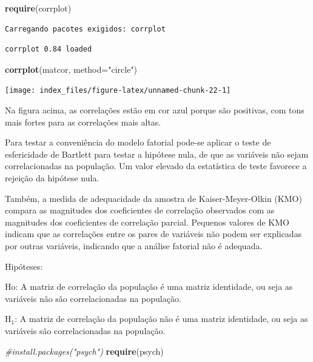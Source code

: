 \documentclass[12pt,brazil,oneside]{book}
\newenvironment{Shaded}{\begin{snugshade}}{\end{snugshade}}
\newcommand{\CommentTok}[1]{\textcolor[rgb]{0.56,0.35,0.01}{\textit{#1}}}
\newcommand{\DataTypeTok}[1]{\textcolor[rgb]{0.13,0.29,0.53}{#1}}
\newcommand{\KeywordTok}[1]{\textcolor[rgb]{0.13,0.29,0.53}{\textbf{#1}}}
\newcommand{\NormalTok}[1]{#1}
\newcommand{\StringTok}[1]{\textcolor[rgb]{0.31,0.60,0.02}{#1}}
\begin{document}
\begin{Shaded}
\begin{Highlighting}[]
\KeywordTok{require}\NormalTok{(corrplot)}
\end{Highlighting}
\end{Shaded}

\begin{verbatim}
Carregando pacotes exigidos: corrplot
\end{verbatim}

\begin{verbatim}
corrplot 0.84 loaded
\end{verbatim}

\begin{Shaded}
\begin{Highlighting}[]
\KeywordTok{corrplot}\NormalTok{(matcor, }\DataTypeTok{method=}\StringTok{"circle"}\NormalTok{)}
\end{Highlighting}
\end{Shaded}

\begin{center}\texttt{[image: index\_files/figure-latex/unnamed-chunk-22-1]} \end{center}

Na figura acima, as correlações estão em cor azul porque são positivas, com tons mais fortes para as correlações mais altas.

Para testar a conveniência do modelo fatorial pode-se aplicar o teste de esfericidade de Bartlett para testar a hipótese nula, de que as variáveis não sejam correlacionadas na população.
Um valor elevado da estatística de teste favorece a rejeição da hipótese nula.

Também, a medida de adequacidade da amostra de Kaiser-Meyer-Olkin (KMO) compara as magnitudes dos coeficientes de correlação observados com as magnitudes dos coeficientes de
correlação parcial. Pequenos valores de KMO indicam que as correlações entre os pares de variáveis não podem ser explicadas por outras variáveis, indicando que a análise fatorial não é adequada.

Hipóteses:

Ho: A matriz de correlação da população é uma matriz identidade, ou seja as variáveis não são correlacionadas na população.

H\(_1\): A matriz de correlação da população não é uma matriz identidade, ou seja as variáveis são correlacionadas na população.

\begin{Shaded}
\begin{Highlighting}[]
\CommentTok{#install.packages("psych")}
\KeywordTok{require}\NormalTok{(psych)}
\end{Highlighting}
\end{Shaded}
\end{document}
